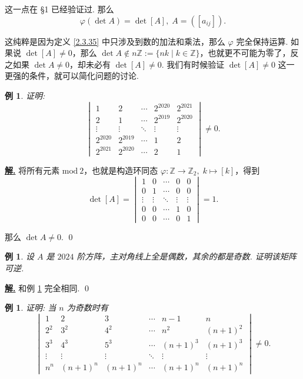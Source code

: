 \documentclass[10pt,openany]{article}
\theoremstyle{thmstyle} %
\theoremstyle{defstyle} %
\theoremstyle{prostyle} %
\theoremstyle{exastyle}
\newtheorem{example}[theorem]{例}
\theoremstyle{remstyle}
\newenvironment{solution}{\par\underline{\textbf{解.}} \;\fangsong}{\qed\par}
\begin{document}
这一点在 \S 1 已经验证过. 那么 
\[ \varphi(\det A)= \det [A], \; A=([a_{ij}]). \]

这纯粹是因为定义 \ref{2.3.35} 中只涉及到数的加法和乘法，那么 \( \varphi \) 完全保持运算. 如果说 \( \det [A] \neq 0 \)，那么 \( \det A \notin n\mathbb{Z}:=\{nk \mid k \in \mathbb{Z} \} \)，也就更不可能为零了，反之如果 \( \det A \neq 0 \)，却未必有 \( \det [A] \neq 0 \). 我们有时候验证 \( \det [A] \neq 0 \) 这一更强的条件，就可以简化问题的讨论.


\begin{example} \label{2.3.37}
	证明: \[
	\begin{vmatrix}
		1 & 2 & \cdots & 2^{2020} & 2^{2021} \\
		2 & 1 & \cdots & 2^{2019} & 2^{2020} \\
		\vdots & \vdots & \ddots & \vdots & \vdots \\
		2^{2020} & 2^{2019} & \cdots & 1 & 2 \\
		2^{2021} & 2^{2020} & \cdots & 2 & 1
	\end{vmatrix} \neq 0.
	\]
\end{example}

\begin{solution}
	将所有元素 \( \text{mod} \ 2 \)，也就是构造环同态 \( \varphi: \mathbb{Z} \to \mathbb{Z}_2, \; k \mapsto [k] \)，得到
	\[ \det [A]=\begin{vmatrix}
		1 & 0 & \cdots & 0 & 0 \\
		0 & 1 & \cdots & 0 & 0 \\
		\vdots & \vdots & \ddots & \vdots & \vdots \\
		0 & 0 & \cdots & 1 & 0 \\
		0 & 0 & \cdots & 0 & 1
	\end{vmatrix}=1.  \]
	
	那么 \( \det A \neq 0 \).
\end{solution}

\begin{example}
	设 \( A  \) 是 \( 2024 \) 阶方阵，主对角线上全是偶数，其余的都是奇数. 证明该矩阵可逆.
\end{example}

\begin{solution}
	和例 \ref{2.3.37} 完全相同.
\end{solution}

\begin{example}
	证明: 当 \( n \) 为奇数时有 \[
	\begin{vmatrix}
		1 & 2 & 3 & \cdots & n-1 & n \\
		2^2 & 3^2 & 4^2 & \cdots & n^2 & (n+1)^2 \\
		3^3 & 4^3 & 5^3 & \cdots & (n+1)^3 & (n+1)^3 \\
		\vdots & \vdots & \vdots & \ddots & \vdots & \vdots \\
		n^n & (n+1)^n & (n+1)^n & \cdots & (n+1)^n & (n+1)^n
	\end{vmatrix} \neq 0.
	\]
\end{example}
\end{document}
